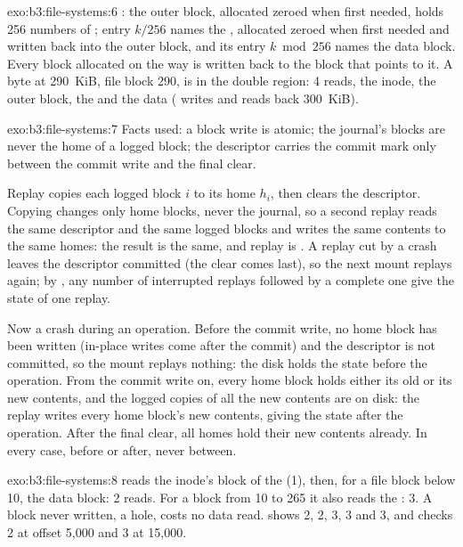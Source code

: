 \begin{solution}{exo:b3:file-systems:6}
: the outer block, allocated zeroed when first needed, holds 256 numbers of ; entry $k / 256$ names the , allocated zeroed when first needed and written back into the outer block, and its entry $k \bmod 256$ names the data block. Every block allocated on the way is written back to the block that points to it. A byte at 290~KiB, file block 290, is in the double region: 4 reads, the inode, the outer block, the  and the data ( writes and reads back 300~KiB).
\end{solution}

\begin{solution}{exo:b3:file-systems:7}
Facts used: a block write is atomic; the journal's blocks are never the home of a logged block; the descriptor carries the commit mark only between the commit write and the final clear.

Replay copies each logged block $i$ to its home $h_i$, then clears the descriptor. Copying changes only home blocks, never the journal, so a second replay reads the same descriptor and the same logged blocks and writes the same contents to the same homes: the result is the same, and replay is . A replay cut by a crash leaves the descriptor committed (the clear comes last), so the next mount replays again; by , any number of interrupted replays followed by a complete one give the state of one replay.

Now a crash during an operation. Before the commit write, no home block has been written (in-place writes come after the commit) and the descriptor is not committed, so the mount replays nothing: the disk holds the state before the operation. From the commit write on, every home block holds either its old or its new contents, and the logged copies of all the new contents are on disk: the replay writes every home block's new contents, giving the state after the operation. After the final clear, all homes hold their new contents already. In every case, before or after, never between.
\end{solution}

\begin{solution}{exo:b3:file-systems:8}
 reads the inode's block of the  (1), then, for a file block below 10, the data block: 2 reads. For a block from 10 to 265 it also reads the : 3. A block never written, a hole, costs no data read.  shows 2, 2, 3, 3 and 3, and  checks 2 at offset 5,000 and 3 at 15,000.
\end{solution}

